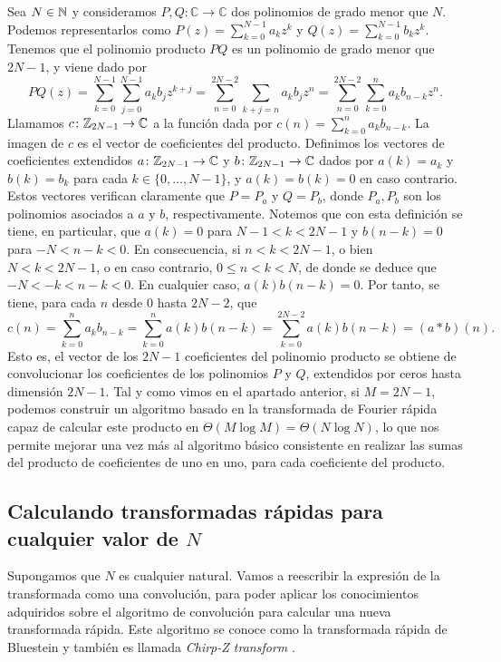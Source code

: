 \documentclass{article}
\begin{document}
Sea $N \in \mathbb{N}$ y consideramos $P,Q\colon \mathbb{C} \to \mathbb{C}$ dos polinomios de grado menor que $N$. Podemos representarlos como $P(z) = \sum_{k=0}^{N-1}a_kz^k$ y $Q(z) = \sum_{k=0}^{N-1}b_kz^k$. Tenemos que el polinomio producto $PQ$ es un polinomio de grado menor que $2N-1$, y viene dado por
\[ PQ(z) = \sum_{k=0}^{N-1}\sum_{j=0}^{N-1}a_kb_jz^{k+j} = \sum_{n=0}^{2N-2}\sum_{k+j=n}a_kb_jz^n = \sum_{n=0}^{2N-2}\sum_{k=0}^{n}a_kb_{n-k}z^n.\]
Llamamos $c\colon \mathbb{Z}_{2N-1} \to \mathbb{C}$ a la función dada por $c(n) = \sum_{k=0}^{n}a_kb_{n-k}$. La imagen de $c$ es el vector de coeficientes del producto. Definimos los vectores de coeficientes extendidos $a\colon \mathbb{Z}_{2N-1} \to \mathbb{C}$ y $b\colon \mathbb{Z}_{2N-1} \to \mathbb{C}$ dados por $a(k)=a_k$ y $b(k)=b_k$ para cada $k \in \{0,\dots,N-1\}$, y $a(k) = b(k) = 0$ en caso contrario. Estos vectores verifican claramente que $P = P_a$ y $Q = P_b$, donde $P_a,P_b$ son los polinomios asociados a $a$ y $b$, respectivamente. Notemos que con esta definición se tiene, en particular, que $a(k)= 0$ para $N-1 < k < 2N-1$ y $b(n-k)=0$ para $-N < n-k < 0$. En consecuencia, si $n < k < 2N-1$, o bien $N < k < 2N-1$, o en caso contrario, $0 \le n < k < N$, de donde se deduce que $-N < -k < n-k < 0$. En cualquier caso, $a(k) b(n-k) = 0$. Por tanto, se tiene, para cada $n$ desde 0 hasta $2N-2$, que
\[ c(n) = \sum_{k=0}^{n}a_kb_{n-k} = \sum_{k=0}^{n}a(k)b(n-k) = \sum_{k=0}^{2N-2}a(k)b(n-k) = (a \ast b)(n).  \]
Esto es, el vector de los $2N-1$ coeficientes del polinomio producto se obtiene de convolucionar los coeficientes de los polinomios $P$ y $Q$, extendidos por ceros hasta dimensión $2N-1$. Tal y como vimos en el apartado anterior, si $M = 2N-1$, podemos construir un algoritmo basado en la transformada de Fourier rápida capaz de calcular este producto en $\Theta(M\log M) = \Theta(N\log N)$, lo que nos permite mejorar una vez más al algoritmo básico consistente en realizar las sumas del producto de coeficientes de uno en uno, para cada coeficiente del producto.



\subsection{Calculando transformadas rápidas para cualquier valor de $N$}

Supongamos que $N$ es cualquier natural. Vamos a reescribir la expresión de la transformada como una convolución, para poder aplicar los conocimientos adquiridos sobre el algoritmo de convolución para calcular una nueva transformada rápida. Este algoritmo se conoce como la transformada rápida de Bluestein y también es llamada \emph{Chirp-Z transform} \cite{rabiner1969chirp}.
\end{document}

